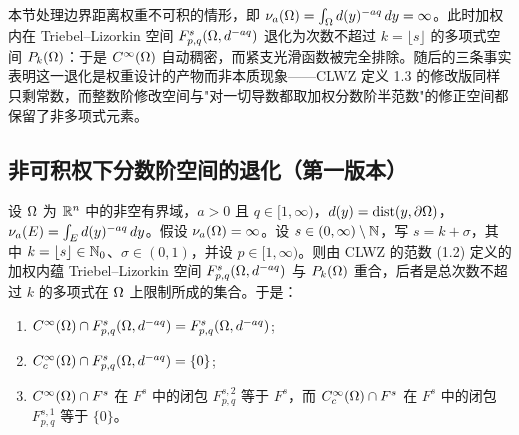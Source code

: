 
本节处理边界距离权重不可积的情形，即 $\nu_{a}(\Omega)=\int_\Omega d(y)^{-aq}\,dy=\infty$。此时加权内在 Triebel--Lizorkin 空间 $F^{s}_{p,q}(\Omega,d^{-aq})$ 退化为次数不超过 $k=\lfloor s\rfloor$ 的多项式空间 $P_k(\Omega)$：于是 $C^\infty(\Omega)$ 自动稠密，而紧支光滑函数被完全排除。随后的三条事实表明这一退化是权重设计的产物而非本质现象——CLWZ 定义 1.3 的修改版同样只剩常数，而整数阶修改空间与"对一切导数都取加权分数阶半范数"的修正空间都保留了非多项式元素。

\subsection{非可积权下分数阶空间的退化（第一版本）}

\begin{theorem}[不可积情形的退化]
设 $\Omega$ 为 $\mathbb{R}^n$ 中的非空有界域，$a>0$ 且 $q\in[1,\infty)$，$d(y)=\operatorname{dist}(y,\partial\Omega)$，$\nu_{a}(E)=\int_E d(y)^{-aq}\,dy$。假设 $\nu_{a}(\Omega)=\infty$。设 $s\in(0,\infty)\setminus\mathbb{N}$，写 $s=k+\sigma$，其中 $k=\lfloor s\rfloor\in\mathbb{N}_0$、$\sigma\in(0,1)$，并设 $p\in[1,\infty)$。则由 CLWZ 的范数 (1.2) 定义的加权内蕴 Triebel--Lizorkin 空间 $F^{s}_{p,q}(\Omega,d^{-aq})$ 与 $P_k(\Omega)$ 重合，后者是总次数不超过 $k$ 的多项式在 $\Omega$ 上限制所成的集合。于是：
\begin{enumerate}[label=(\alph*)]
\item $C^\infty(\Omega)\cap F^{s}_{p,q}(\Omega,d^{-aq})=F^{s}_{p,q}(\Omega,d^{-aq})$;
\item $C_c^\infty(\Omega)\cap F^{s}_{p,q}(\Omega,d^{-aq})=\{0\}$;
\item $C^\infty(\Omega)\cap F^s$ 在 $F^s$ 中的闭包 $F^{s,2}_{p,q}$ 等于 $F^s$，而 $C_c^\infty(\Omega)\cap F^s$ 在 $F^s$ 中的闭包 $F^{s,1}_{p,q}$ 等于 $\{0\}$。
\end{enumerate}
\end{theorem}

